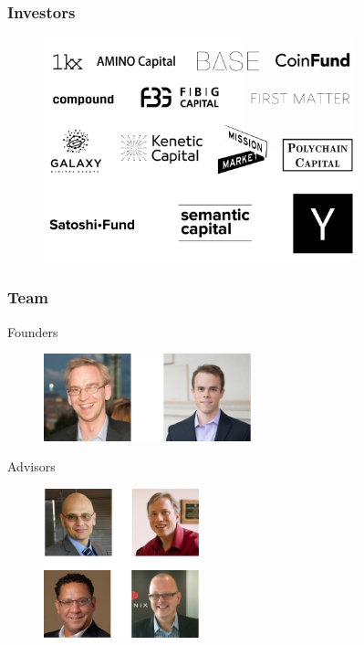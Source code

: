 \documentclass[xetex,mathsans,sans]{beamer}
\begin{document}
    \begin{frame}
        \frametitle{Investors}
        \begin{figure}
            \centering
            \includegraphics[height=6.5cm]{pdf/investors.pdf}
        \end{figure}
    \end{frame}

    \begin{frame}
        \frametitle{Team}
        Founders
        \begin{figure}
            \centering
            \includegraphics[width=6cm]{pdf/founders.pdf}
        \end{figure}

        Advisors
        \begin{figure}
            \centering
            \includegraphics[width=4.5cm]{pdf/advisors.pdf}
        \end{figure}
    \end{frame}
\end{document}
